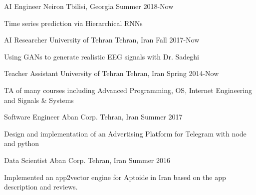 

\begin{cventries}

 \cventry
    {AI Engineer} %
    {Neiron} %
    {Tbilisi, Georgia} %
    {Summer 2018-Now} %
    {
      \begin{cvitems} %
        \item {Time series prediction via Hierarchical RNNs}
      \end{cvitems}
    }

 \cventry
    {AI Researcher} %
    {University of Tehran} %
    {Tehran, Iran} %
    {Fall 2017-Now} %
    {
      \begin{cvitems} %
        \item {Using GANs to generate realistic EEG signals with Dr. Sadeghi}
      \end{cvitems}
    }

 \cventry
    {Teacher Assistant} %
    {University of Tehran} %
    {Tehran, Iran} %
    {Spring 2014-Now} %
    {
      \begin{cvitems} %
        \item {TA of many courses including Advanced Programming, OS, Internet Engineering and Signals \& Systems}
      \end{cvitems}
    }

 \cventry
    {Software Engineer} %
    {Aban Corp.} %
    {Tehran, Iran} %
    {Summer 2017} %
    {
      \begin{cvitems} %
        \item {Design and implementation of an Advertising Platform for Telegram with node and python}
      \end{cvitems}
    }


  \cventry
    {Data Scientist} %
    {Aban Corp.} %
    {Tehran, Iran} %
    {Summer 2016} %
    {
      \begin{cvitems} %
        \item {Implemented an app2vector engine for Aptoide in Iran based on the app description and reviews.}
      \end{cvitems}
    }


\end{cventries}
